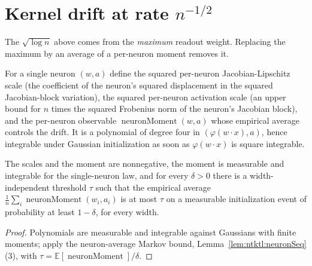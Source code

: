 \section{Kernel drift at rate $n^{-1/2}$}\label{sec:ntktl:drift}

The $\sqrt{\log n}$ above comes from the \emph{maximum} readout weight. Replacing the maximum by an average of a per-neuron moment removes it.

\begin{definition}\label{def:ntktl:neuronMoment}
  \leanok
For a single neuron $(w,a)$ define the squared per-neuron Jacobian-Lipschitz scale (the coefficient of the neuron's squared displacement in the squared Jacobian-block variation), the squared per-neuron activation scale (an upper bound for $n$ times the squared Frobenius norm of the neuron's Jacobian block),
and the per-neuron observable $\operatorname{neuronMoment}(w,a)$ whose empirical average controls the drift. It is a polynomial of degree four in $(\varphi(w\cdot x),a)$, hence integrable under Gaussian initialization as soon as $\varphi(w\cdot x)$ is square integrable.
\end{definition}

\begin{lemma}\label{lem:ntktl:neuronMomentProps}
  \leanok
The scales and the moment are nonnegative, the moment is measurable and integrable for the single-neuron law, and for every $\delta>0$ there is a width-independent threshold $\tau$ such that the empirical average $\frac1n\sum_i\operatorname{neuronMoment}(w_i,a_i)$ is at most $\tau$ on a measurable initialization event of probability at least $1-\delta$, for every width.
\end{lemma}

\begin{proof}
  \leanok
Polynomials are measurable and integrable against Gaussians with finite moments; apply the neuron-average Markov bound, Lemma~\ref{lem:ntktl:neuronSeq}(3), with $\tau=\mathbb E[\operatorname{neuronMoment}]/\delta$.
\end{proof}

